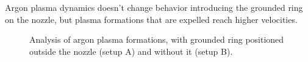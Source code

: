 Argon plasma dynamics doesn't change behavior introducing the grounded ring on the nozzle, but plasma formations that are expelled reach higher velocities.

\begin{figure}
 \centering
 \hfill
 
 
 \hfill
 \caption{Analysis of argon plasma formations, with grounded ring positioned outside the nozzle (setup A) and without it (setup B).}
 \label{fig:argon_af}
\end{figure}

